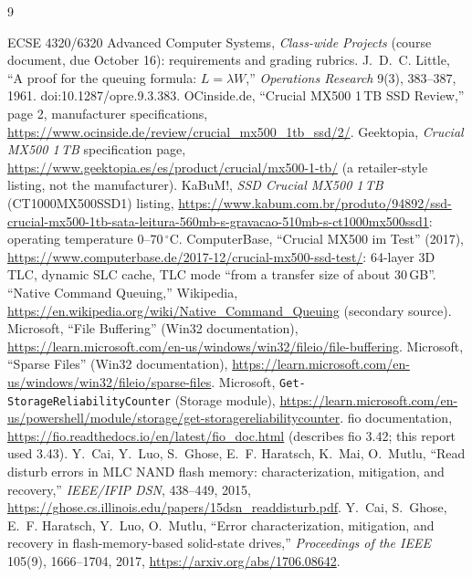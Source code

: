 \documentclass{article}
\begin{document}
\begin{thebibliography}{9}
\raggedright\small
{} ECSE 4320/6320 Advanced Computer Systems, \emph{Class-wide Projects} (course document, due October 16): requirements and grading rubrics.
 J.~D.~C. Little, ``A proof for the queuing formula: $L=\lambda W$,'' \emph{Operations Research} 9(3), 383--387, 1961. doi:10.1287/opre.9.3.383.
 OCinside.de, ``Crucial MX500 1\,TB SSD Review,'' page 2, manufacturer specifications, \url{https://www.ocinside.de/review/crucial_mx500_1tb_ssd/2/}.
 Geektopia, \emph{Crucial MX500 1\,TB} specification page, \url{https://www.geektopia.es/es/product/crucial/mx500-1-tb/} (a retailer-style listing, not the manufacturer).
 KaBuM!, \emph{SSD Crucial MX500 1\,TB} (CT1000MX500SSD1) listing, \url{https://www.kabum.com.br/produto/94892/ssd-crucial-mx500-1tb-sata-leitura-560mb-s-gravacao-510mb-s-ct1000mx500ssd1}: operating temperature 0--70\,$^{\circ}$C.
 ComputerBase, ``Crucial MX500 im Test'' (2017), \url{https://www.computerbase.de/2017-12/crucial-mx500-ssd-test/}: 64-layer 3D TLC, dynamic SLC cache, TLC mode ``from a transfer size of about 30\,GB''.
 ``Native Command Queuing,'' Wikipedia, \url{https://en.wikipedia.org/wiki/Native_Command_Queuing} (secondary source).
 Microsoft, ``File Buffering'' (Win32 documentation), \url{https://learn.microsoft.com/en-us/windows/win32/fileio/file-buffering}.
 Microsoft, ``Sparse Files'' (Win32 documentation), \url{https://learn.microsoft.com/en-us/windows/win32/fileio/sparse-files}.
 Microsoft, \texttt{Get-StorageReliabilityCounter} (Storage module), \url{https://learn.microsoft.com/en-us/powershell/module/storage/get-storagereliabilitycounter}.
 fio documentation, \url{https://fio.readthedocs.io/en/latest/fio_doc.html} (describes fio 3.42; this report used 3.43).
 Y.~Cai, Y.~Luo, S.~Ghose, E.~F. Haratsch, K.~Mai, O.~Mutlu, ``Read disturb errors in MLC NAND flash memory: characterization, mitigation, and recovery,'' \emph{IEEE/IFIP DSN}, 438--449, 2015, \url{https://ghose.cs.illinois.edu/papers/15dsn_readdisturb.pdf}.
 Y.~Cai, S.~Ghose, E.~F. Haratsch, Y.~Luo, O.~Mutlu, ``Error characterization, mitigation, and recovery in flash-memory-based solid-state drives,'' \emph{Proceedings of the IEEE} 105(9), 1666--1704, 2017, \url{https://arxiv.org/abs/1706.08642}.
\end{thebibliography}
\end{document}
